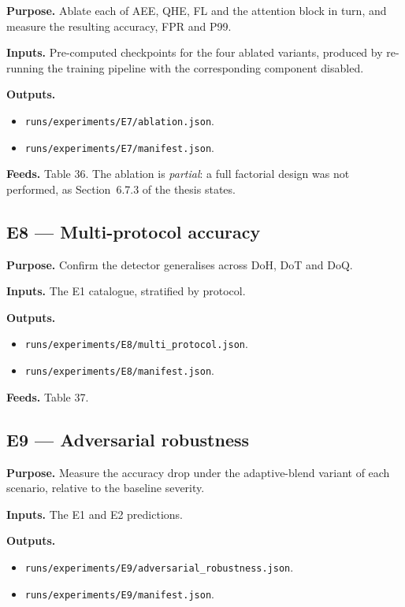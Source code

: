 \textbf{Purpose.} Ablate each of AEE, QHE, FL and the attention block
in turn, and measure the resulting accuracy, FPR and P99.

\textbf{Inputs.} Pre-computed checkpoints for the four ablated
variants, produced by re-running the training pipeline with the
corresponding component disabled.

\textbf{Outputs.}
\begin{itemize}
\item \texttt{runs/experiments/E7/ablation.json}.
\item \texttt{runs/experiments/E7/manifest.json}.
\end{itemize}

\textbf{Feeds.} Table 36. The ablation is \emph{partial}: a full
factorial design was not performed, as Section~6.7.3 of the thesis
states.

\subsection{E8 --- Multi-protocol accuracy}

\textbf{Purpose.} Confirm the detector generalises across DoH, DoT
and DoQ.

\textbf{Inputs.} The E1 catalogue, stratified by protocol.

\textbf{Outputs.}
\begin{itemize}
\item \texttt{runs/experiments/E8/multi\_protocol.json}.
\item \texttt{runs/experiments/E8/manifest.json}.
\end{itemize}

\textbf{Feeds.} Table 37.

\subsection{E9 --- Adversarial robustness}

\textbf{Purpose.} Measure the accuracy drop under the adaptive-blend
variant of each scenario, relative to the baseline severity.

\textbf{Inputs.} The E1 and E2 predictions.

\textbf{Outputs.}
\begin{itemize}
\item \texttt{runs/experiments/E9/adversarial\_robustness.json}.
\item \texttt{runs/experiments/E9/manifest.json}.
\end{itemize}

